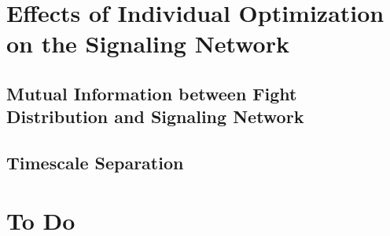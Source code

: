 \documentclass{article}
\begin{document}
\section{Effects of Individual Optimization on the Signaling Network }

\subsection{Mutual Information between Fight Distribution and Signaling Network }

\subsection{Timescale Separation }



\section{To Do }
\end{document}
